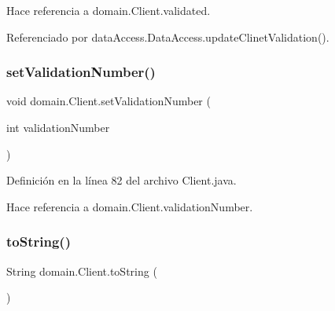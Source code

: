Hace referencia a domain.\+Client.\+validated.



Referenciado por data\+Access.\+Data\+Access.\+update\+Clinet\+Validation().

\mbox{\label{classdomain_1_1_client_a0973728bc4625ebdb83feea51d7de519}} 
\subsubsection{\texorpdfstring{setValidationNumber()}{setValidationNumber()}}
{\footnotesize\ttfamily void domain.\+Client.\+set\+Validation\+Number (\begin{DoxyParamCaption}\item[{int}]{validation\+Number }\end{DoxyParamCaption})}



Definición en la línea 82 del archivo Client.\+java.


\begin{DoxyCode}{0}

\end{DoxyCode}


Hace referencia a domain.\+Client.\+validation\+Number.

\mbox{\label{classdomain_1_1_client_a5fc558240fa2d8ee6a87c41d373069fc}} 
\subsubsection{\texorpdfstring{toString()}{toString()}}
{\footnotesize\ttfamily String domain.\+Client.\+to\+String (\begin{DoxyParamCaption}{ }\end{DoxyParamCaption})}



